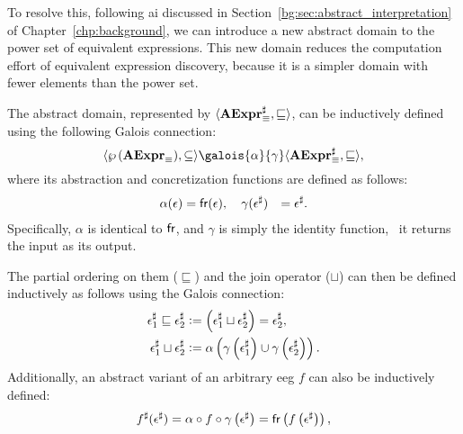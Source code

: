 To resolve this, following \acrlong{ai} discussed in
Section~\ref{bg:sec:abstract_interpretation} of Chapter~\ref{chp:background},
we can introduce a new abstract domain to the power set of equivalent
expressions.  This new domain reduces the computation effort of equivalent
expression discovery, because it is a simpler domain with fewer elements than
the power set.

The abstract domain, represented by $\langle{\ensuremath\mathbf{AExpr}^\sharp_\equiv}, {\sqsubseteq}\rangle$, can
be inductively defined using the following Galois connection:
\begin{equation}
    \lattice{\eqexprpowerset}{\subseteq}
    \galois{\alpha}{\gamma}
    \lattice{\absexprset}{\sqsubseteq},
\end{equation}
where its abstraction and concretization functions are defined as follows:
\begin{equation}
    \begin{aligned}
        \alpha(\epsilon) &= \operatorname{\mathsf{fr}}(\epsilon), \quad
        \gamma(\epsilon^\sharp) &= \epsilon^\sharp.
    \end{aligned}
\end{equation}
Specifically, $\alpha$ is identical to $\operatorname{\mathsf{fr}}$, and $\gamma$ is simply the
identity function, \ie~it returns the input as its output.

The partial ordering on them ($\sqsubseteq$) and the join operator ($\sqcup$)
can then be defined inductively as follows using the Galois connection:
\begin{equation}
    \begin{aligned}
        \epsilon^\sharp_1 \sqsubseteq \epsilon^\sharp_2 &\vcentcolon=
            \left( \epsilon^\sharp_1 \sqcup \epsilon^\sharp_2 \right)
            = \epsilon^\sharp_2, \\
        \epsilon^\sharp_1 \sqcup \epsilon^\sharp_2 &\vcentcolon=
            \alpha\left(
                \gamma\left( \epsilon^\sharp_1 \right) \cup
                \gamma\left( \epsilon^\sharp_2 \right)
            \right).
    \end{aligned}
\end{equation}
Additionally, an abstract variant of an arbitrary \gls{eeg} $f$ can also be
inductively defined:
\begin{equation}
    f^\sharp (\epsilon^\sharp)
    = \alpha \circ f \circ \gamma \left(\epsilon^\sharp\right)
    = \operatorname{\mathsf{fr}}\left(f\left(\epsilon^\sharp\right)\right),
\end{equation}

